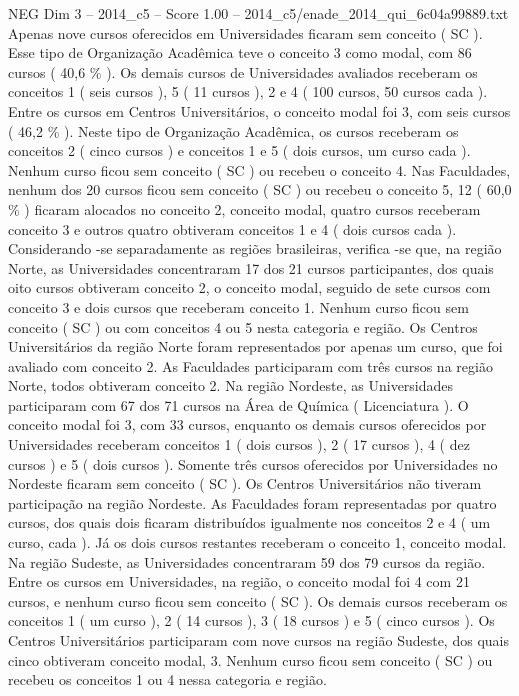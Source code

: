 \begin{textsample}{NEG Dim 3 – 2014\_c5 – Score 1.00 – 2014\_c5/enade\_2014\_qui\_6c04a99889.txt}
Apenas nove cursos oferecidos em Universidades ficaram sem conceito ( SC ).
Esse tipo de Organização Acadêmica teve o conceito 3 como modal, com 86 cursos ( 40,6 \% ).
Os demais cursos de Universidades avaliados receberam os conceitos 1 ( seis cursos ), 5 ( 11 cursos ), 2 e 4 ( 100 cursos, 50 cursos cada ).
Entre os cursos em Centros Universitários, o conceito modal foi 3, com seis cursos ( 46,2 \% ).
Neste tipo de Organização Acadêmica, os cursos receberam os conceitos 2 ( cinco cursos ) e conceitos 1 e 5 ( dois cursos, um curso cada ).
Nenhum curso ficou sem conceito ( SC ) ou recebeu o conceito 4.
Nas Faculdades, nenhum dos 20 cursos ficou sem conceito ( SC ) ou recebeu o conceito 5, 12 ( 60,0 \% ) ficaram alocados no conceito 2, conceito modal, quatro cursos receberam conceito 3 e outros quatro obtiveram conceitos 1 e 4 ( dois cursos cada ).
Considerando -se separadamente as regiões brasileiras, verifica -se que, na região Norte, as Universidades concentraram 17 dos 21 cursos participantes, dos quais oito cursos obtiveram conceito 2, o conceito modal, seguido de sete cursos com conceito 3 e dois cursos que receberam conceito 1.
Nenhum curso ficou sem conceito ( SC ) ou com conceitos 4 ou 5 nesta categoria e região.
Os Centros Universitários da região Norte foram representados por apenas um curso, que foi avaliado com conceito 2.
As Faculdades participaram com três cursos na região Norte, todos obtiveram conceito 2.
Na região Nordeste, as Universidades participaram com 67 dos 71 cursos na Área de Química ( Licenciatura ).
O conceito modal foi 3, com 33 cursos, enquanto os demais cursos oferecidos por Universidades receberam conceitos 1 ( dois cursos ), 2 ( 17 cursos ), 4 ( dez cursos ) e 5 ( dois cursos ).
Somente três cursos oferecidos por Universidades no Nordeste ficaram sem conceito ( SC ).
Os Centros Universitários não tiveram participação na região Nordeste.
As Faculdades foram representadas por quatro cursos, dos quais dois ficaram distribuídos igualmente nos conceitos 2 e 4 ( um curso, cada ).
Já os dois cursos restantes receberam o conceito 1, conceito modal.
Na região Sudeste, as Universidades concentraram 59 dos 79 cursos da região.
Entre os cursos em Universidades, na região, o conceito modal foi 4 com 21 cursos, e nenhum curso ficou sem conceito ( SC ).
Os demais cursos receberam os conceitos 1 ( um curso ), 2 ( 14 cursos ), 3 ( 18 cursos ) e 5 ( cinco cursos ).
Os Centros Universitários participaram com nove cursos na região Sudeste, dos quais cinco obtiveram conceito modal, 3.
Nenhum curso ficou sem conceito ( SC ) ou recebeu os conceitos 1 ou 4 nessa categoria e região.

\end{textsample}
